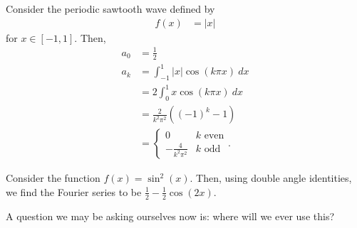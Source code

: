 \documentclass[10pt]{mypackage}
\begin{document}
\begin{example}
  Consider the periodic sawtooth wave defined by
  \begin{align*}
    f(x) &= \left\vert x \right\vert
  \end{align*}
  for $x\in \left[ -1,1 \right]$. Then,
  \begin{align*}
    a_0 &= \frac{1}{2}\\
    a_k &=\int_{-1}^{1} \left\vert x \right\vert\cos\left( k\pi x \right)\:dx\\
        &= 2 \int_{0}^{1} x \cos\left( k\pi x \right)\:dx\\
        &= \frac{2}{k^2\pi^2}\left( \left( -1 \right)^{k}-1 \right)\\
        &= \begin{cases}
          0 & k\text{ even}\\
          -\frac{4}{k^2\pi^2} & k\text{ odd}
        \end{cases}.
  \end{align*}
\end{example}
\begin{example}
  Consider the function $f(x) = \sin^2\left( x \right)$. Then, using double angle identities, we find the Fourier series to be $\frac{1}{2}- \frac{1}{2}\cos\left( 2x \right)$.
\end{example}
A question we may be asking ourselves now is: where will we ever use this?
\end{document}
